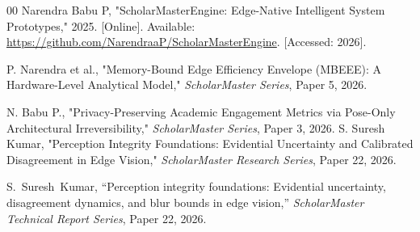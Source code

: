 \documentclass[conference]{IEEEtran}
\begin{document}
\begin{thebibliography}{00}
 Narendra Babu P, "ScholarMasterEngine: Edge-Native Intelligent System Prototypes," 2025. [Online]. Available: \url{https://github.com/NarendraaP/ScholarMasterEngine}. [Accessed: 2026].

 P. Narendra et al., "Memory-Bound Edge Efficiency Envelope (MBEEE): A Hardware-Level Analytical Model," \textit{ScholarMaster Series}, Paper 5, 2026.

 N. Babu P., "Privacy-Preserving Academic Engagement Metrics via Pose-Only Architectural Irreversibility," \textit{ScholarMaster Series}, Paper 3, 2026.
 S. Suresh Kumar, "Perception Integrity Foundations: Evidential Uncertainty and Calibrated Disagreement in Edge Vision," \textit{ScholarMaster Research Series}, Paper 22, 2026.

 S.~Suresh~Kumar, ``Perception integrity foundations: Evidential uncertainty, disagreement dynamics, and blur bounds in edge vision,'' \emph{ScholarMaster Technical Report Series}, Paper 22, 2026.
\end{thebibliography}
\end{document}

